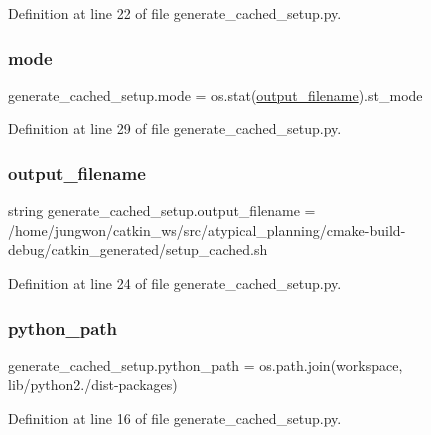 Definition at line 22 of file generate\+\_\+cached\+\_\+setup.\+py.

\mbox{\label{namespacegenerate__cached__setup_a10081e5abedae9bd46dd91202096e789}} 
\subsubsection{\texorpdfstring{mode}{mode}}
{\footnotesize\ttfamily generate\+\_\+cached\+\_\+setup.\+mode = os.\+stat(\hyperlink{namespacegenerate__cached__setup_a0265aee5075ee1eb701ff69c98ad6793}{output\+\_\+filename}).st\+\_\+mode}



Definition at line 29 of file generate\+\_\+cached\+\_\+setup.\+py.

\mbox{\label{namespacegenerate__cached__setup_a0265aee5075ee1eb701ff69c98ad6793}} 
\subsubsection{\texorpdfstring{output\+\_\+filename}{output\_filename}}
{\footnotesize\ttfamily string generate\+\_\+cached\+\_\+setup.\+output\+\_\+filename = \textquotesingle{}/home/jungwon/catkin\+\_\+ws/src/atypical\+\_\+planning/cmake-\/build-\/debug/catkin\+\_\+generated/setup\+\_\+cached.\+sh\textquotesingle{}}



Definition at line 24 of file generate\+\_\+cached\+\_\+setup.\+py.

\mbox{\label{namespacegenerate__cached__setup_a72579fd01529a79bab20d99291889d3f}} 
\subsubsection{\texorpdfstring{python\+\_\+path}{python\_path}}
{\footnotesize\ttfamily generate\+\_\+cached\+\_\+setup.\+python\+\_\+path = os.\+path.\+join(workspace, \textquotesingle{}lib/python2./dist-\/packages\textquotesingle{})}



Definition at line 16 of file generate\+\_\+cached\+\_\+setup.\+py.

